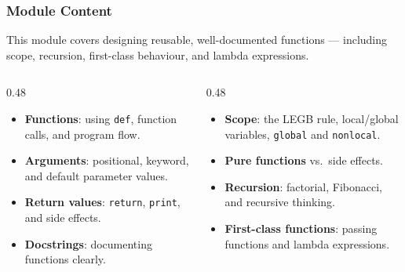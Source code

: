 \documentclass[aspectratio=169,10pt]{beamer}
\newcommand{\keyword}[1]{\textcolor{PrimaryBlue}{\textbf{#1}}}
\newcommand{\codeword}[1]{\texttt{#1}}
\begin{document}
\begin{frame}[fragile]
\frametitle{Module Content}
\small
This module covers designing reusable, well-documented functions — including scope, recursion, first-class behaviour, and lambda expressions.

\vspace{0.16cm}
\begin{columns}[T,totalwidth=0.96\textwidth]
\begin{column}{0.48\textwidth}
\begin{itemize}\setlength\itemsep{0.08cm}
  \item \keyword{Functions}: using \codeword{def}, function calls, and program flow.
  \item \keyword{Arguments}: positional, keyword, and default parameter values.
  \item \keyword{Return values}: \codeword{return}, \codeword{print}, and side effects.
  \item \keyword{Docstrings}: documenting functions clearly.
\end{itemize}
\end{column}
\begin{column}{0.48\textwidth}
\begin{itemize}\setlength\itemsep{0.08cm}
  \item \keyword{Scope}: the LEGB rule, local/global variables, \codeword{global} and \codeword{nonlocal}.
  \item \keyword{Pure functions} vs.\ side effects.
  \item \keyword{Recursion}: factorial, Fibonacci, and recursive thinking.
  \item \keyword{First-class functions}: passing functions and lambda expressions.
\end{itemize}
\end{column}
\end{columns}
\end{frame}
\end{document}
